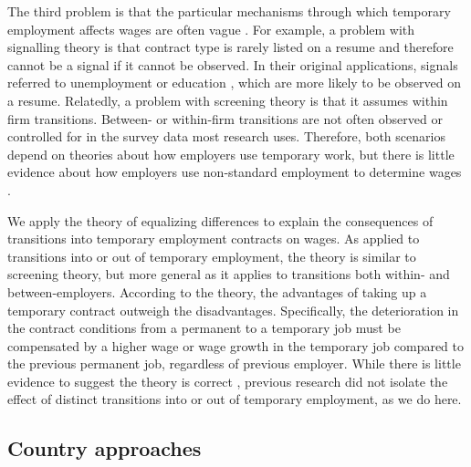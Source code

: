 \documentclass[12pt]{article}
\begin{document}
The third problem is that the particular mechanisms through which temporary employment affects wages are often vague \citep[table 1]{fuller_career_2015}.  For example, a problem with signalling theory is that contract type is rarely listed on a resume and therefore cannot be a signal if it cannot be observed.  In their original applications, signals referred to unemployment or education \citep{spence_job_1973}, which are more likely to be observed on a resume.  Relatedly, a problem with screening theory is that it assumes within firm transitions.  Between- or within-firm transitions are not often observed or controlled for in the survey data most research uses.  Therefore, both scenarios depend on theories about how employers use temporary work, but there is little evidence about how employers use non-standard employment to determine wages \citep{mattijssen_scarred_2022,bills_demand_2017}.  

We apply the theory of equalizing differences \citep{rosen_theory_1986} to explain the consequences of transitions into temporary employment contracts on wages.  As applied to transitions into or out of temporary employment, the theory is similar to screening theory, but more general as it applies to transitions both within- and between-employers.  According to the theory, the advantages of taking up a temporary contract outweigh the disadvantages.  Specifically, the deterioration in the contract conditions from a permanent to a temporary job must be compensated by a higher wage or wage growth in the temporary job compared to the previous permanent job, regardless of previous employer.  While there is little evidence to suggest the theory is correct \citep{de_graaf-zijl_compensation_2012,hagen_temporary_2002}, previous research did not isolate the effect of distinct transitions into or out of temporary employment, as we do here.  


\subsection{Country approaches}
\end{document}
